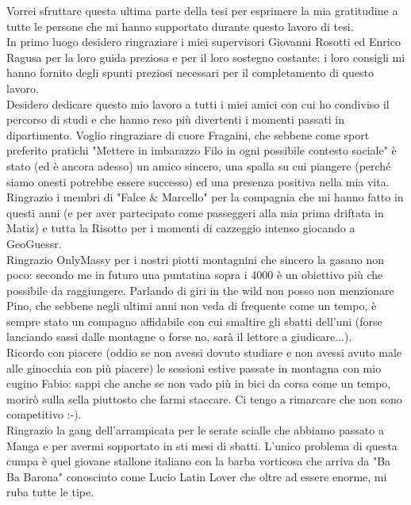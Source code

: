 \newpage
\begin{acknowledgements}
Vorrei sfruttare questa ultima parte della tesi per esprimere la mia gratitudine a tutte le persone che mi hanno supportato durante questo lavoro di tesi.\\

In primo luogo desidero ringraziare i miei supervisori Giovanni Rosotti ed Enrico Ragusa per la loro guida preziosa e per il loro sostegno costante: i loro consigli mi hanno fornito degli spunti preziosi necessari per il completamento di questo lavoro.\\

Desidero dedicare questo mio lavoro a tutti i miei amici con cui ho condiviso il percorso di studi e che hanno reso più divertenti i momenti passati in dipartimento. 
Voglio ringraziare di cuore Fragaini, che sebbene come sport preferito pratichi "Mettere in imbarazzo Filo in ogni possibile contesto sociale" è stato (ed è ancora adesso) un amico sincero, una spalla su cui piangere (perché siamo onesti potrebbe essere successo) ed una presenza positiva nella mia vita.
Ringrazio i membri di "Falce $\&$ Marcello" per la compagnia che mi hanno fatto in questi anni (e per aver partecipato come passeggeri alla mia prima driftata in Matiz) e tutta la Risotto per i momenti di cazzeggio intenso giocando a GeoGuessr. \\

Ringrazio OnlyMassy per i nostri piotti montagnini che sincero la gasano non poco: secondo me in futuro una puntatina sopra i 4000 è un obiettivo più che possibile da raggiungere. Parlando di giri in the wild non posso non menzionare Pino, che sebbene negli ultimi anni non veda di frequente come un tempo, è sempre stato un compagno affidabile con cui smaltire gli sbatti dell'uni (forse lanciando sassi dalle montagne o forse no, sarà il lettore a giudicare...).\\

Ricordo con piacere (oddio se non avessi dovuto studiare e non avessi avuto male alle ginocchia con più piacere) le sessioni estive passate in montagna con mio cugino Fabio: sappi che anche se non vado più in bici da corsa come un tempo, morirò sulla sella piuttosto che farmi staccare. Ci tengo a rimarcare che non sono competitivo :-).\\

Ringrazio la gang dell'arrampicata per le serate scialle che abbiamo passato a Manga e per avermi sopportato in sti mesi di sbatti. L'unico problema di questa cumpa è quel giovane stallone italiano con la barba vorticosa che arriva da "Ba Ba Barona" conosciuto come Lucio Latin Lover che oltre ad essere enorme, mi ruba tutte le tipe.\\


\end{acknowledgements}
